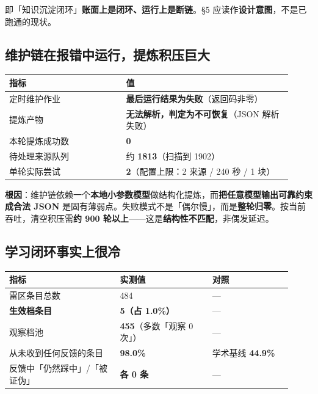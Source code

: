 \documentclass[11pt,a4paper]{ctexart}
\newcommand{\warnbox}[1]{%
  \begin{center}%
  \begin{minipage}{0.94\linewidth}%
  \setlength{\fboxsep}{9pt}%
  \colorbox{QuoteBg}{\parbox{\dimexpr\linewidth-2\fboxsep}{%
    \color{WarnRed}#1}}%
  \end{minipage}%
  \end{center}%
}
\begin{document}
\warnbox{即「知识沉淀闭环」\textbf{账面上是闭环、运行上是断链}。§5 应读作\textbf{设计意图}，不是已跑通的现状。}

\subsection{维护链在报错中运行，提炼积压巨大}

\begin{center}
\begin{tabular}{@{}p{0.38\linewidth}p{0.54\linewidth}@{}}
\toprule
\textbf{指标} & \textbf{值} \\
\midrule
定时维护作业 & \textbf{最后运行结果为失败}（返回码非零） \\
提炼产物 & \textbf{无法解析，判定为不可恢复}（JSON 解析失败） \\
本轮提炼成功数 & \textbf{0} \\
待处理来源队列 & 约 \textbf{1813}（扫描到 1902） \\
单轮实际尝试 & \textbf{2}（配置上限：2 来源 / 240 秒 / 1 块） \\
\bottomrule
\end{tabular}
\end{center}

\textbf{根因}：维护链依赖一个\textbf{本地小参数模型}做结构化提炼，而\textbf{把任意模型输出可靠约束成合法 JSON} 是固有薄弱点。失败模式不是「偶尔慢」，而是\textbf{整轮归零}。按当前吞吐，清空积压需\textbf{约 900 轮以上}——这是\textbf{结构性不匹配}，非偶发延迟。

\subsection{学习闭环事实上很冷}

\begin{center}
\begin{tabular}{@{}p{0.36\linewidth}p{0.30\linewidth}p{0.26\linewidth}@{}}
\toprule
\textbf{指标} & \textbf{实测值} & \textbf{对照} \\
\midrule
雷区条目总数 & 484 & — \\
\textbf{生效档条目} & \textbf{5（占 1.0\%）} & — \\
观察档池 & \textbf{455}（多数「观察 0 次」） & — \\
从未收到任何反馈的条目 & \textbf{98.0\%} & 学术基线 \textbf{44.9\%} \\
反馈中「仍然踩中」/「被证伪」 & \textbf{各 0 条} & — \\
\bottomrule
\end{tabular}
\end{center}
\end{document}
